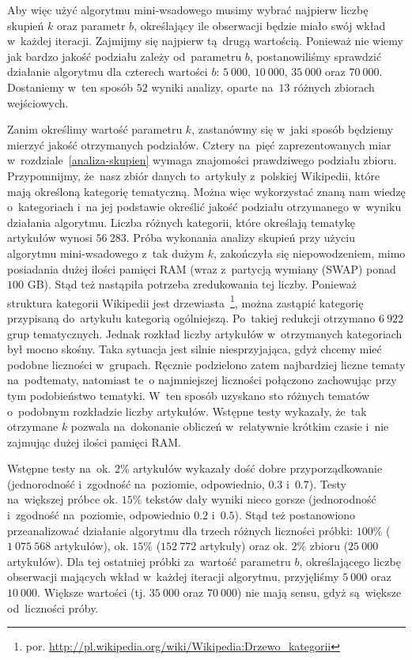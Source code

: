 \documentclass{praca1}
\begin{document}
Aby więc użyć algorytmu mini-wsadowego musimy wybrać najpierw liczbę skupień $k$ oraz parametr $b$, określający ile obserwacji będzie miało swój wkład w~każdej iteracji. Zajmijmy się najpierw tą~drugą wartością. Ponieważ nie wiemy jak bardzo jakość podziału zależy od~parametru $b$, postanowiliśmy sprawdzić działanie algorytmu dla czterech wartości $b$: $5\ 000$, $10\ 000$, $35\ 000$ oraz $70\ 000$. Dostaniemy w~ten sposób $52$ wyniki analizy, oparte na~$13$ różnych zbiorach wejściowych.

Zanim określimy wartość parametru $k$, zastanówmy się w~jaki sposób będziemy mierzyć jakość otrzymanych podziałów. Cztery na~pięć zaprezentowanych miar w~rozdziale~\ref{analiza-skupien} wymaga znajomości prawdziwego podziału zbioru. Przypomnijmy, że~nasz zbiór danych to~artykuły z~polskiej Wikipedii, które mają określoną kategorię tematyczną. Można więc wykorzystać znaną nam wiedzę o~kategoriach i~na jej podstawie określić jakość podziału otrzymanego w~wyniku działania algorytmu. Liczba różnych kategorii, które określają tematykę artykułów wynosi $56\ 283$. Próba wykonania analizy skupień przy użyciu algorytmu mini-wsadowego z~tak dużym $k$, zakończyła się niepowodzeniem, mimo posiadania dużej ilości pamięci RAM (wraz z~partycją wymiany (SWAP) ponad $100$ GB). Stąd też nastąpiła potrzeba zredukowania tej liczby. Ponieważ struktura kategorii Wikipedii jest drzewiasta~\footnote{por. \url{http://pl.wikipedia.org/wiki/Wikipedia:Drzewo_kategorii}}, można zastąpić kategorię przypisaną do~artykułu kategorią ogólniejszą. Po~takiej redukcji otrzymano $6\ 922$ grup tematycznych. Jednak rozkład liczby artykułów w~otrzymanych kategoriach był mocno skośny. Taka sytuacja jest silnie niesprzyjająca, gdyż chcemy mieć podobne liczności w~grupach. Ręcznie podzielono zatem najbardziej liczne tematy na~podtematy, natomiast te~o najmniejszej liczności połączono zachowując przy tym podobieństwo tematyki. W~ten sposób uzyskano sto różnych tematów o~podobnym rozkładzie liczby artykułów. Wstępne testy wykazały, że~tak otrzymane $k$ pozwala na~dokonanie obliczeń w~relatywnie krótkim czasie i~nie zajmując dużej ilości pamięci RAM.

Wstępne testy na~ok. $2\%$ artykułów wykazały dość dobre przyporządkowanie (jednorodność i~zgodność na~poziomie, odpowiednio, $0.3$ i~$0.7$). Testy na~większej próbce ok. $15\%$ tekstów dały wyniki nieco gorsze (jednorodność i~zgodność na~poziomie, odpowiednio $0.2$ i~$0.5$). Stąd też postanowiono przeanalizować działanie algorytmu dla trzech różnych liczności próbki: $100\%$ ($1\ 075\ 568$ artykułów), ok. $15\%$ ($152\ 772$ artykuły) oraz ok. $2\%$ zbioru ($25\ 000$ artykułów). Dla tej ostatniej próbki za~wartość parametru $b$, określającego liczbę obserwacji mających wkład w~każdej iteracji algorytmu, przyjęliśmy $5\ 000$ oraz $10\ 000$. Większe wartości (tj. $35\ 000$ oraz $70\ 000$) nie mają sensu, gdyż są~większe od~liczności próby.
\end{document}
